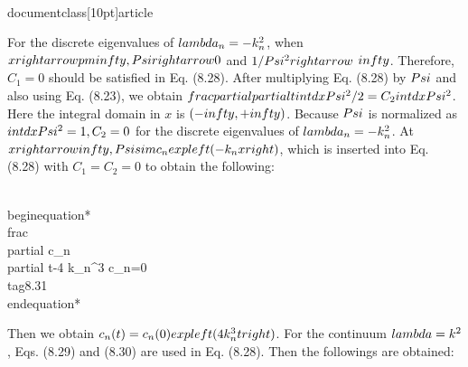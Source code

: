 \\documentclass[10pt]{article}
\begin{document}
{{{{{For the discrete eigenvalues of $\\lambda_{n}=-k_{n}^{2}$, when $x \\rightarrow \\pm \\infty, \\Psi \\rightarrow 0$ and $1 / \\Psi^{2} \\rightarrow$ $\\infty$. Therefore, $C_{1}=0$ should be satisfied in Eq. (8.28). After multiplying Eq. (8.28) by $\\Psi$ and also using Eq. (8.23), we obtain $\\frac{\\partial}{\\partial t} \\int d x \\Psi^{2} / 2=C_{2} \\int d x \\Psi^{2}$. Here the integral domain in $x$ is $(-\\infty,+\\infty)$. Because $\\Psi$ is normalized as $\\int d x \\Psi^{2}=1, C_{2}=0$ for the discrete eigenvalues of $\\lambda_{n}=-k_{n}^{2}$. At $x \\rightarrow \\infty, \\Psi \\sim c_{n} \\exp \\left(-k_{n} x\\right)$, which is inserted into Eq. (8.28) with $C_{1}=C_{2}=0$ to obtain the following:


\\begin{equation*}
\\frac{\\partial c_{n}}{\\partial t}-4 k_{n}^{3} c_{n}=0 \\tag{8.31}
\\end{equation*}


Then we obtain $c_{n}(t)=c_{n}(0) \\exp \\left(4 k_{n}^{3} t\\right)$. For the continuum $\\lambda=k^{2}$, Eqs. (8.29) and (8.30) are used in Eq. (8.28). Then the followings are obtained:


}}}}}
\end{document}
